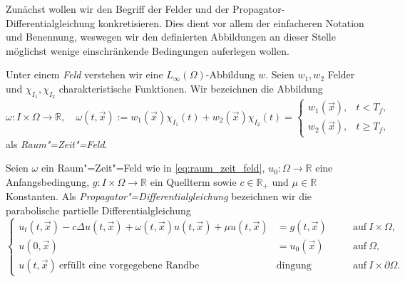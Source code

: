 \documentclass[../main.tex]{subfiles}
\begin{document}
Zunächst wollen wir den Begriff der Felder und der Propagator-Differentialgleichung konkretisieren.
Dies dient vor allem der einfacheren Notation und Benennung, weswegen wir den definierten Abbildungen an dieser Stelle möglichst wenige einschränkende Bedingungen auferlegen wollen.

\begin{Definition}
\label{definition:feld_raum_zeit_feld}
    Unter einem \emph{Feld} verstehen wir eine $L_{\infty}(\Omega)$-Abbildung $w$.
    Seien $w_{1}, w_{2}$ Felder und $\chi_{I_{1}}, \chi_{I_{2}}$ charakteristische Funktionen.
    Wir bezeichnen die Abbildung\newline
    \begin{equation}
    \label{eq:raum_zeit_feld}
        \omega \colon I \times \Omega \to \mathbb{R}, \quad \omega(t, \vec{x}) :=
        w_{1}(\vec{x}) \chi_{I_{1}}(t) + w_{2}(\vec{x}) \chi_{I_{2}}(t)
        =
        \begin{cases}
            w_{1}(\vec{x}), & t < T_{f}, \\
            w_{2}(\vec{x}), & t \geq T_{f},
        \end{cases}
    \end{equation}
    als \emph{Raum"=Zeit"=Feld}.
\end{Definition}

\begin{Definition}
\label{definition:propagator_differentialgleichung}
    Seien $\omega$ ein Raum"=Zeit"=Feld wie in \cref{eq:raum_zeit_feld}, $u_{0} \colon \Omega \to \mathbb{R}$ eine Anfangsbedingung, $g \colon I \times \Omega \to \mathbb{R}$ ein Quellterm sowie $c \in \mathbb{R}_{+}$ und $\mu \in \mathbb{R}$ Konstanten.
    Als \emph{Propagator"=Differentialgleichung} bezeichnen wir die parabolische partielle Differentialgleichung
    \begin{equation}
    \label{eq:propagator_differentialgleichung}
        \left\{
        \begin{aligned}
            u_{t}(t, \vec{x}) - c \Delta u(t, \vec{x}) + \omega(t, \vec{x}) u(t, \vec{x}) + \mu u(t, \vec{x}) &= g(t, \vec{x}) \quad &&\text{auf}~I \times \Omega,\\
            u(0, \vec{x}) &= u_{0}(\vec{x}) \quad &&\text{auf}~\Omega, \\
            u(t, \vec{x})~\text{erfüllt eine vorgegebene Randbe}&\text{dingung} &&\text{auf}~I \times \partial \Omega.
        \end{aligned}
        \right.
    \end{equation}
\end{Definition}
\end{document}
